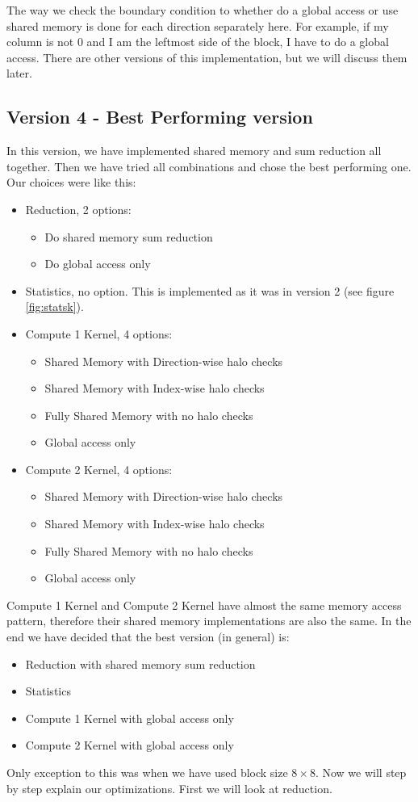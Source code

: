 \documentclass[12pt,reqno]{amsart}
\begin{document}
The way we check the boundary condition to whether do a global access or use shared memory is done for each direction separately here. For example, if my column is not 0 and I am the leftmost side of the block, I have to do a global access. There are other versions of this implementation, but we will discuss them later.

\subsection{Version 4 - Best Performing version}
In this version, we have implemented shared memory and sum reduction all together. Then we have tried all combinations and chose the best performing one. Our choices were like this:
\begin{itemize}
	\item Reduction, 2 options:
	\begin{itemize}
		\item Do shared memory sum reduction
		\item Do global access only
	\end{itemize}
	\item Statistics, no option. This is implemented as it was in version 2 (see figure \ref{fig:statsk}).
	\item Compute 1 Kernel, 4 options:
	\begin{itemize}
		\item Shared Memory with Direction-wise halo checks
		\item Shared Memory with Index-wise halo checks
		\item Fully Shared Memory with no halo checks
		\item Global access only
	\end{itemize}
	\item Compute 2 Kernel, 4 options:
	\begin{itemize}
		\item Shared Memory with Direction-wise halo checks
		\item Shared Memory with Index-wise halo checks
		\item Fully Shared Memory with no halo checks
		\item Global access only
	\end{itemize}
\end{itemize}

Compute 1 Kernel and Compute 2 Kernel have almost the same memory access pattern, therefore their shared memory implementations are also the same. In the end we have decided that the best version (in general) is:
\begin{itemize}
	\item Reduction with shared memory sum reduction
	\item Statistics
	\item Compute 1 Kernel with global access only
	\item Compute 2 Kernel with global access only
\end{itemize}
Only exception to this was when we have used block size $8\times8$. Now we will step by step explain our optimizations. First we will look at reduction.
\end{document}

